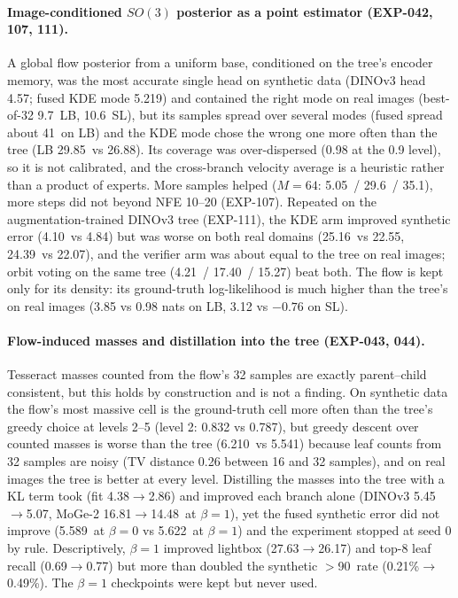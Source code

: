 \paragraph{Image-conditioned $SO(3)$ posterior as a point estimator (EXP-042, 107, 111).}
A global flow posterior from a uniform base, conditioned on the tree's encoder memory, was the most accurate single head on synthetic data (DINOv3 head 4.57\appDdeg; fused KDE mode 5.219\appDdeg) and contained the right mode on real images (best-of-32 9.7\appDdeg\ LB, 10.6\appDdeg\ SL), but its samples spread over several modes (fused spread about 41\appDdeg\ on LB) and the KDE mode chose the wrong one more often than the tree (LB 29.85\appDdeg\ vs 26.88\appDdeg). Its coverage was over-dispersed (0.98 at the 0.9 level), so it is not calibrated, and the cross-branch velocity average is a heuristic rather than a product of experts. More samples helped ($M=64$: 5.05\appDdeg\ / 29.6\appDdeg\ / 35.1\appDdeg), more steps did not beyond NFE 10--20 (EXP-107). Repeated on the augmentation-trained DINOv3 tree (EXP-111), the KDE arm improved synthetic error (4.10\appDdeg\ vs 4.84\appDdeg) but was worse on both real domains (25.16\appDdeg\ vs 22.55\appDdeg, 24.39\appDdeg\ vs 22.07\appDdeg), and the verifier arm was about equal to the tree on real images; orbit voting on the same tree (4.21\appDdeg\ / 17.40\appDdeg\ / 15.27\appDdeg) beat both. The flow is kept only for its density: its ground-truth log-likelihood is much higher than the tree's on real images (3.85 vs 0.98 nats on LB, 3.12 vs $-0.76$ on SL).

\paragraph{Flow-induced masses and distillation into the tree (EXP-043, 044).}
Tesseract masses counted from the flow's 32 samples are exactly parent--child consistent, but this holds by construction and is not a finding. On synthetic data the flow's most massive cell is the ground-truth cell more often than the tree's greedy choice at levels 2--5 (level 2: 0.832 vs 0.787), but greedy descent over counted masses is worse than the tree (6.210\appDdeg\ vs 5.541\appDdeg) because leaf counts from 32 samples are noisy (TV distance 0.26 between 16 and 32 samples), and on real images the tree is better at every level. Distilling the masses into the tree with a KL term took (fit 4.38$\to$2.86) and improved each branch alone (DINOv3 5.45$\to$5.07\appDdeg, MoGe-2 16.81$\to$14.48\appDdeg\ at $\beta=1$), yet the fused synthetic error did not improve (5.589\appDdeg\ at $\beta=0$ vs 5.622\appDdeg\ at $\beta=1$) and the experiment stopped at seed 0 by rule. Descriptively, $\beta=1$ improved lightbox (27.63$\to$26.17\appDdeg) and top-8 leaf recall (0.69$\to$0.77) but more than doubled the synthetic $>$90\appDdeg\ rate (0.21\%$\to$0.49\%). The $\beta=1$ checkpoints were kept but never used.

